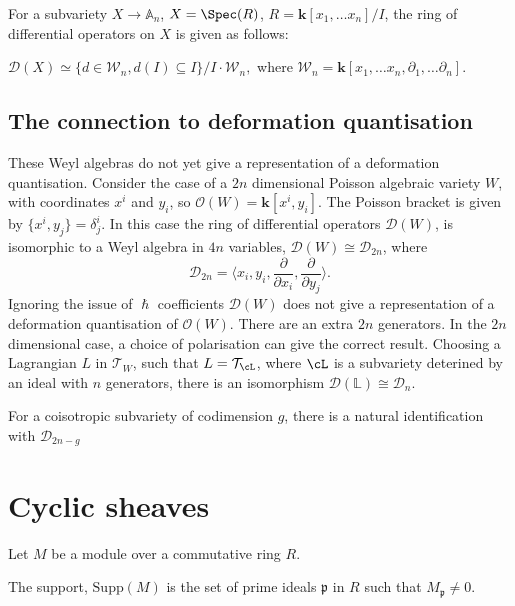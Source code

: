     For a subvariety \(X \rightarrow \mathbb{A}_n\), \(X = \Spec(R)\),  \(R=\mathbf{k}[x_1, \dots x_n]/I\), the ring of differential operators on \(X\) is given as follows:
    \begin{lem}
    \(  \mathcal{D}(X) \simeq \{ d \in \mathcal{W}_n, d(I) \subseteq I \}/I \cdot \mathcal{W}_n,\)  where
    \( \mathcal{W}_n=\mathbf{k}[x_1,\dots x_n, \partial_1, \dots \partial_n]\).
    \end{lem}
    
    \subsection{The connection to deformation quantisation}
    
    These Weyl algebras do not yet give a representation of a deformation quantisation. Consider the case of a \(2n\) dimensional Poisson algebraic variety \(W\), with coordinates \( x^i\) and \(y_i\), so 
    \( \mathcal{O}(W) = \mathbf{k}[x^i, y_i]\). The Poisson bracket is given by \( \{x^i, y_j \} = \delta_{j}^i\). 
    In this case the ring of differential operators \( \mathcal{D}(W) \), is isomorphic to a Weyl algebra in \(4n\) variables, \( \mathcal{D}(W) \cong \mathcal{D}_{2n}\), where \[\mathcal{D}_{2n} = \langle  x_i, y_i, \frac{\partial}{ \partial x_i}, \frac{\partial}{ \partial y_j} \rangle  .\] 
    Ignoring the issue of \( \hslash \) coefficients \( \mathcal{D}(W)\) does not give a representation of a deformation quantisation of \( \mathcal{O}(W) \). There are an extra \(2n\) generators. In the \(2n\) dimensional case, a choice of polarisation can give the correct result. Choosing a Lagrangian \(L\) in \(\mathcal{T}_W\), such that \( L = \mathcal{T}_{\cL} \), where \( \cL\) is a subvariety
    deterined by an ideal with \(n\) generators, there is an isomorphism \(\mathcal{D}(\mathbb{L})  \cong \mathcal{D}_n\).
    
    
    For a coisotropic subvariety of codimension \(g\),  there is a natural identification with \( \mathcal{D}_{2n-g}\) 
            
    \section{Cyclic sheaves}
     Let \(M\) be a module over a commutative ring \(R\). 
    \begin{defn}[Support]
    The support, \( \mathrm{Supp}(M)\) is the set of prime ideals \( \mathfrak{p}\) in \(R\) such that \(M_{\mathfrak{p}} \neq 0\).
    \end{defn}
    
